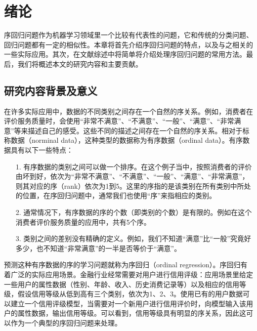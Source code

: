 
\chapter{绪论}
\label{chap:introduction}

序回归问题作为机器学习领域里一个比较有代表性的问题，它和传统的分类问题、回归问题都有一定的相似性。本章将首先介绍序回归问题的特点，以及与之相关的一些实际应用。其次，在文献综述中将简单将介绍处理序回归问题的常用方法。最后，我们将概述本文的研究内容和主要贡献。

\section{研究内容背景及意义}
\label{intro_back}
在许多实际应用中，数据的不同类别之间存在一个自然的序关系。例如，消费者在评价服务质量时，会使用“非常不满意”、“不满意”、“一般”、“满意”、“非常满意”等来描述自己的感受。这些不同的描述之间存在一个自然的序关系。相对于标称数据（norminal data），这种类型的数据称为有序数据（ordinal data）。有序数据具有以下一些特点：
\begin{enumerate}
\item[1.] 有序数据的类别之间可以做一个排序。在这个例子当中，按照消费者的评价由坏到好，依次为“非常不满意”、“不满意”、“一般”、“满意”、“非常满意”，则其对应的序（rank）依次为1到5。这里的序指的是该类别在所有类别中所处的位置，在序回归问题中，通常我们也使用“序”来指相应的类别。
\item[2.] 通常情况下，有序数据的序的个数（即类别的个数）是有限的。例如在这个消费者评价服务质量的应用中，共有5个序。
\item[3.] 类别之间的差别没有精确的定义。例如，我们不知道“满意”比“一般”究竟好多少，也不知道“非常满意”的一半是否等价于“满意”。
\end{enumerate}
预测这种有序数据的序的学习问题就称为序回归（ordinal regression）。序回归有着广泛的实际应用场景。金融行业经常需要对用户进行信用评级：应用场景里给定一些用户的属性数据（性别、年龄、收入、历史消费记录等）以及相应的信用等级，假设信用等级从低到高有三个类别，依次为1、2、3。使用已有的用户数据可以建立一个信用评级模型，当需要对一个新用户进行信用评价时，向模型输入该用户的属性数据，输出信用等级。可以看到，信用等级具有明显的序关系，因此这可以作为一个典型的序回归问题来处理\citep{kwon1997ordinal}\citep{kim2012corporate}\citep{dikkers2005support}\citep{fernandez2013addressing}。
